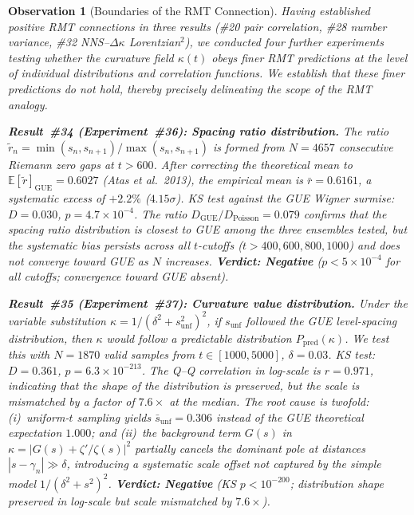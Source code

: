 \documentclass[11pt, a4paper]{article}
\theoremstyle{definition}
\theoremstyle{plain}
\newtheorem{observation}[theorem]{Observation}
\begin{document}
\begin{observation}[Boundaries of the RMT Connection]
\label{obs:rmt_boundaries}
Having established positive RMT connections in three results
(\#20 pair correlation, \#28 number variance, \#32 NNS--$\Delta\kappa$
Lorentzian$^2$), we conducted four further experiments testing whether
the curvature field $\kappa(t)$ obeys finer RMT predictions at the level
of individual distributions and correlation functions.
We establish that these finer predictions \emph{do not hold}, thereby
precisely delineating the scope of the RMT analogy.

\smallskip\noindent
\textbf{Result~\#34 (Experiment~\#36): Spacing ratio distribution.}\;
The ratio $\tilde{r}_n = \min(s_n,s_{n+1})/\max(s_n,s_{n+1})$ is formed
from $N = 4657$ consecutive Riemann zero gaps at $t > 600$.
After correcting the theoretical mean to
$\mathbb{E}[\tilde{r}]_\text{GUE} = 0.6027$ (Atas \textit{et al.}\ 2013),
the empirical mean is $\bar{r} = 0.6161$, a systematic excess of $+2.2\%$
($4.15\sigma$).  KS test against the GUE Wigner surmise:
$D = 0.030$, $p = 4.7 \times 10^{-4}$.
The ratio $D_\text{GUE}/D_\text{Poisson} = 0.079$ confirms that the spacing
ratio distribution \emph{is closest to GUE} among the three ensembles
tested, but the systematic bias persists across all $t$-cutoffs
($t > 400, 600, 800, 1000$) and does not converge toward GUE as $N$
increases.
\textbf{Verdict: Negative} ($p < 5 \times 10^{-4}$ for all cutoffs;
convergence toward GUE absent).

\smallskip\noindent
\textbf{Result~\#35 (Experiment~\#37): Curvature value distribution.}\;
Under the variable substitution $\kappa = 1/(\delta^2 + s_\text{unf}^2)^2$,
if $s_\text{unf}$ followed the GUE level-spacing distribution, then
$\kappa$ would follow a predictable distribution $P_\text{pred}(\kappa)$.
We test this with $N = 1870$ valid samples from $t \in [1000, 5000]$,
$\delta = 0.03$.
KS test: $D = 0.361$, $p = 6.3 \times 10^{-213}$.
The Q--Q correlation in log-scale is $r = 0.971$, indicating that the
\emph{shape} of the distribution is preserved, but the \emph{scale} is
mismatched by a factor of $7.6\times$ at the median.
The root cause is twofold: (i)~uniform-$t$ sampling yields
$\bar{s}_\text{unf} = 0.306$ instead of the GUE theoretical expectation
$1.000$; and (ii)~the background term $G(s)$ in
$\kappa = |G(s) + \zeta'/\zeta(s)|^2$ partially cancels the dominant pole
at distances $|s - \gamma_n| \gg \delta$, introducing a systematic scale
offset not captured by the simple model $1/(\delta^2 + s^2)^2$.
\textbf{Verdict: Negative} (KS $p < 10^{-200}$; distribution shape
preserved in log-scale but scale mismatched by $7.6\times$).


\end{observation}
\end{document}
